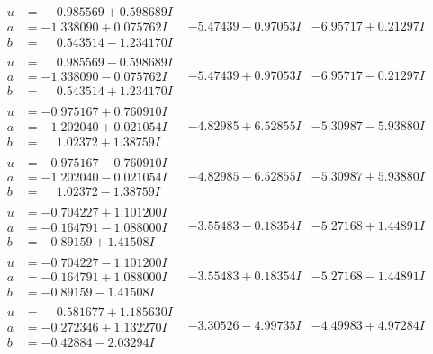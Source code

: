 \documentclass[1p]{elsarticle_modified}
\theoremstyle{definition}
\begin{document}
$$\begin{array}{c|c|c}
 \hline 
\begin{aligned}
u &= \phantom{-}0.985569 + 0.598689 I \\
a &= -1.338090 + 0.075762 I \\
b &= \phantom{-}0.543514 - 1.234170 I\end{aligned}
 & -5.47439 - 0.97053 I & -6.95717 + 0.21297 I \\ \hline\begin{aligned}
u &= \phantom{-}0.985569 - 0.598689 I \\
a &= -1.338090 - 0.075762 I \\
b &= \phantom{-}0.543514 + 1.234170 I\end{aligned}
 & -5.47439 + 0.97053 I & -6.95717 - 0.21297 I \\ \hline\begin{aligned}
u &= -0.975167 + 0.760910 I \\
a &= -1.202040 + 0.021054 I \\
b &= \phantom{-}1.02372 + 1.38759 I\end{aligned}
 & -4.82985 + 6.52855 I & -5.30987 - 5.93880 I \\ \hline\begin{aligned}
u &= -0.975167 - 0.760910 I \\
a &= -1.202040 - 0.021054 I \\
b &= \phantom{-}1.02372 - 1.38759 I\end{aligned}
 & -4.82985 - 6.52855 I & -5.30987 + 5.93880 I \\ \hline\begin{aligned}
u &= -0.704227 + 1.101200 I \\
a &= -0.164791 - 1.088000 I \\
b &= -0.89159 + 1.41508 I\end{aligned}
 & -3.55483 - 0.18354 I & -5.27168 + 1.44891 I \\ \hline\begin{aligned}
u &= -0.704227 - 1.101200 I \\
a &= -0.164791 + 1.088000 I \\
b &= -0.89159 - 1.41508 I\end{aligned}
 & -3.55483 + 0.18354 I & -5.27168 - 1.44891 I \\ \hline\begin{aligned}
u &= \phantom{-}0.581677 + 1.185630 I \\
a &= -0.272346 + 1.132270 I \\
b &= -0.42884 - 2.03294 I\end{aligned}
 & -3.30526 - 4.99735 I & -4.49983 + 4.97284 I \\ \hline\begin{aligned}

\end{aligned}
\end{array}$$
\end{document}
